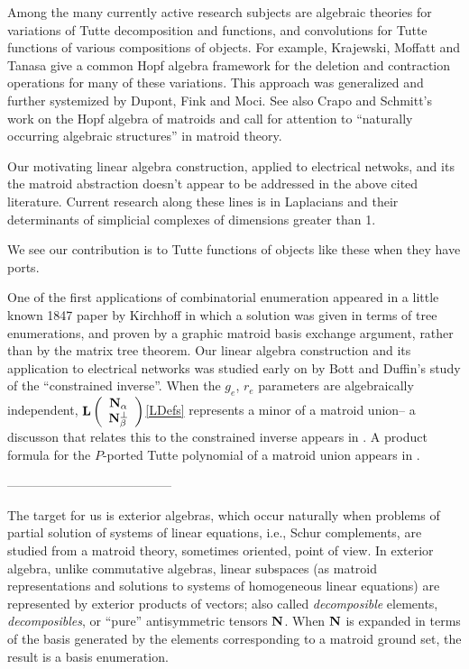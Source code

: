 
Among the many currently active research subjects
are algebraic theories for variations of
Tutte decomposition and functions, and convolutions for
Tutte functions of various compositions of objects.  
For example,
Krajewski, Moffatt and Tanasa give a common Hopf algebra framework
for the deletion and contraction operations for many of
these variations\cite{KRAJEWSKI2018271}.
This approach was generalized and further systemized by
Dupont, Fink and Moci\cite{UnivTutteCharCombCoalgDupontFinkMoci}.
See also Crapo and Schmitt's work
on the Hopf algebra of matroids and call
for attention to ``naturally occurring algebraic
structures'' in matroid theory\cite{CRAPO20051066}.  

Our motivating linear algebra construction, applied to
electrical netwoks, and its the matroid
abstraction
doesn't appear to be addressed in the above cited literature.
Current research along these lines is in Laplacians and their
determinants of simplicial complexes of dimensions greater than 1.

We see our contribution is to Tutte functions of objects like these
when they have ports.  


One of the
first applications of combinatorial enumeration
appeared in a little known 1847 paper by Kirchhoff\cite{Kirchhoff}
in which a solution was given in terms of tree enumerations,
and proven by a graphic matroid basis exchange argument, rather
than by the matrix tree theorem.
Our linear algebra construction and its application to
electrical networks was studied early on by
Bott and Duffin's\cite{BottDuffinAlgNetworks} study of the ``constrained
inverse''.  When the $g_e$, $r_e$ parameters are algebraically independent,
$\mathbf{L}\left( \begin{array}{c} {\ensuremath{\mathbf{N}_{\alpha}}}\\ {\mathbf{N}_{\beta}^{\perp}} \end{array} \right)$\ref{LDefs} represents a minor of a matroid union--
a discusson that relates this to the constrained
inverse appears in \cite{sdcBDIMatroid}.  A product formula for
the $P$-ported Tutte polynomial of a matroid union appears in
\cite{sdcPorted}.  

---------------------------------------
\newpage

The target for us
is exterior algebras, which occur naturally when problems of
partial solution of systems of linear equations\cite{ExteriorAlgInLinalgRef},
i.e., Schur complements,
are studied from a matroid theory, sometimes oriented, point of view.
In exterior algebra, unlike commutative algebras,
linear subspaces (as matroid representations and
solutions to systems of homogeneous linear equations)
are represented by exterior products of vectors; also called
\emph{decomposible} elements, \emph{decomposibles},
or ``pure'' antisymmetric tensors $\mathbf{N}$.
When $\mathbf{N}$ is expanded in terms of the basis
generated by the elements corresponding to a matroid
ground set, the result is a basis enumeration.


